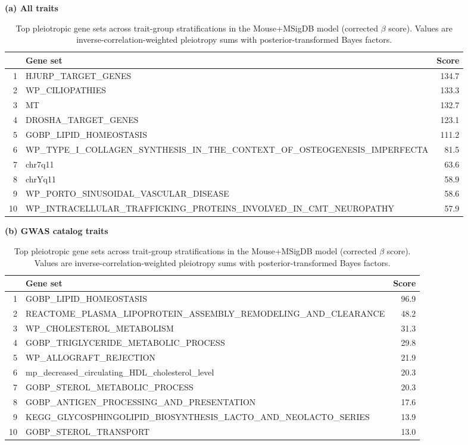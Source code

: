 \begin{table}[t!]
\caption{Top pleiotropic gene sets across trait-group stratifications in the Mouse+MSigDB model (corrected $\beta$ score). Values are inverse-correlation-weighted pleiotropy sums with posterior-transformed Bayes factors.}
\label{tab:top-geneset-pleiotropy-beta}
\centering
\small
\setlength{\tabcolsep}{4pt}
\renewcommand{\arraystretch}{1.08}

\vspace{4pt}
\textbf{(a) All traits}\\[2pt]
\begin{tabular}{@{} r l r @{}}
\toprule
 & \textbf{Gene set} & \textbf{Score} \\
\midrule
1 & HJURP\_TARGET\_GENES & 134.7 \\
2 & WP\_CILIOPATHIES & 133.3 \\
3 & MT & 132.7 \\
4 & DROSHA\_TARGET\_GENES & 123.1 \\
5 & GOBP\_LIPID\_HOMEOSTASIS & 111.2 \\
6 & WP\_TYPE\_I\_COLLAGEN\_SYNTHESIS\_IN\_THE\_CONTEXT\_OF\_OSTEOGENESIS\_IMPERFECTA & 81.5 \\
7 & chr7q11 & 63.6 \\
8 & chrYq11 & 58.9 \\
9 & WP\_PORTO\_SINUSOIDAL\_VASCULAR\_DISEASE & 58.6 \\
10 & WP\_INTRACELLULAR\_TRAFFICKING\_PROTEINS\_INVOLVED\_IN\_CMT\_NEUROPATHY & 57.9 \\
\bottomrule
\end{tabular}

\vspace{8pt}
\textbf{(b) GWAS catalog traits}\\[2pt]
\begin{tabular}{@{} r l r @{}}
\toprule
 & \textbf{Gene set} & \textbf{Score} \\
\midrule
1 & GOBP\_LIPID\_HOMEOSTASIS & 96.9 \\
2 & REACTOME\_PLASMA\_LIPOPROTEIN\_ASSEMBLY\_REMODELING\_AND\_CLEARANCE & 48.2 \\
3 & WP\_CHOLESTEROL\_METABOLISM & 31.3 \\
4 & GOBP\_TRIGLYCERIDE\_METABOLIC\_PROCESS & 29.8 \\
5 & WP\_ALLOGRAFT\_REJECTION & 21.9 \\
6 & mp\_decreased\_circulating\_HDL\_cholesterol\_level & 20.3 \\
7 & GOBP\_STEROL\_METABOLIC\_PROCESS & 20.3 \\
8 & GOBP\_ANTIGEN\_PROCESSING\_AND\_PRESENTATION & 17.6 \\
9 & KEGG\_GLYCOSPHINGOLIPID\_BIOSYNTHESIS\_LACTO\_AND\_NEOLACTO\_SERIES & 13.9 \\
10 & GOBP\_STEROL\_TRANSPORT & 13.0 \\
\bottomrule
\end{tabular}


\end{table}
